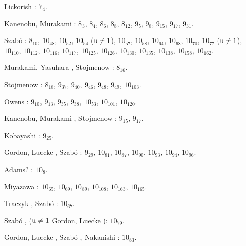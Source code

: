 \begin{compactitem}
\item Lickorish \cite{lickorish1985}: $7_{4}$.
%
\item Kanenobu, Murakami \cite{kanenobumurakami1986}: $8_{3}$, $8_{4}$, $8_{6}$, $8_{8}$, $8_{12}$, $9_{5}$, $9_{8}$, $9_{15}$, $9_{17}$, $9_{31}$.
%
%
\item Szabó \cite{szabo2005}: $8_{10}$, $10_{48}$, $10_{52}$, $10_{54}$ ($\operatorname{u} \neq 1$), $10_{57}$, $10_{58}$, $10_{64}$, $10_{68}$, $10_{70}$, $10_{77}$ ($\operatorname{u} \neq 1$), $10_{110}$, $10_{112}$, $10_{116}$, $10_{117}$, $10_{125}$, $10_{126}$, $10_{130}$, $10_{135}$, $10_{138}$, $10_{158}$, $10_{162}$.
%
\item Murakami, Yasuhara \cite{yasuhara2000}, Stojmenow \cite{stoimenow2004}: $8_{16}$.
%
%
\item Stojmenow \cite{stoimenow2004}: $8_{18}$, $9_{37}$, $9_{40}$, $9_{46}$, $9_{48}$, $9_{49}$, $10_{103}$.
\item Owens \cite{owens2008}: $9_{10}$, $9_{13}$, $9_{35}$, $9_{38}$, $10_{53}$, $10_{101}$, $10_{120}$.
%
\item Kanenobu, Murakami \cite{kanenobumurakami1986}, Stojmenow \cite{stoimenow2004}: $9_{15}$, $9_{17}$.
\item Kobayashi \cite{kobayashi1989}: $9_{25}$.
%
\item Gordon, Luecke \cite{gordon2006}, Szabó \cite{szabo2005}: $9_{29}$, $10_{81}$, $10_{87}$, $10_{90}$, $10_{93}$, $10_{94}$, $10_{96}$.
%
%
\item Adams? \cite[s. 62]{adams1994}: $10_{8}$.
%
\item Miyazawa \cite{miyazawa1998}: $10_{65}$, $10_{69}$, $10_{89}$, $10_{108}$, $10_{163}$, $10_{165}$.
%
\item Traczyk \cite{traczyk1999}, Szabó \cite{szabo2005}: $10_{67}$.
%
\item Szabó \cite{szabo2005}, ($\operatorname{u} \neq 1$ Gordon, Luecke \cite{gordon2006}): $10_{79}$.
\item Gordon, Luecke \cite{gordon2006}, Szabó \cite{szabo2005}, Nakanishi \cite{nakanishi2005}: $10_{83}$.

\end{compactitem}
